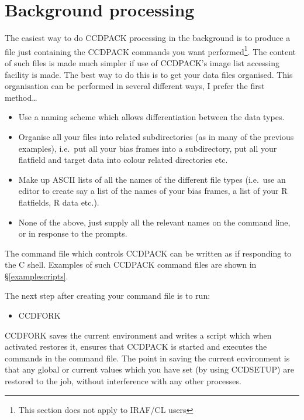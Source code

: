 \documentclass[twoside,11pt]{article}
\newcommand{\hyperref}[4]{#2\ref{#4}#3}
\newcommand{\htmlref}[2]{#1}
\newcommand{\xlabel}[1]{}
\renewcommand{\_}{\texttt{\symbol{95}}}
\newcommand{\routine}[1]{{\sc #1}}
\newcommand{\xroutine}[1]{\htmlref{{\sc #1}}{#1}}
\begin{document}
\section{\xlabel{backgroundprocessing}Background processing
         \label{backgroundprocessing}}

The easiest way to do CCDPACK processing in the background is to
produce a file just containing the CCDPACK commands you want
performed\footnote{This section does not apply to IRAF/CL users}. The
content of such files is made much simpler if use of CCDPACK's image
list accessing facility is made. The best way to do this is to get
your data files organised. This organisation can be performed in
several different ways, I prefer the first method\ldots

\begin{itemize}
\item Use a naming scheme which allows differentiation between the data
types.

\item Organise all your files into related subdirectories (as in many of
the previous examples), i.e.\ put all your bias frames into a
subdirectory, put all your flatfield and target data into colour related
directories etc.

\item Make up ASCII lists of all the names of the different file types
(i.e.\ use an editor to create say a list of the names of your bias
frames, a list of your R flatfields, R data etc.).


\item None of the above, just supply all the relevant names on the
command line, or in response to the prompts.
\end{itemize}

The command file which controls CCDPACK can be written as if
responding to the C shell. Examples of such CCDPACK command files
are shown \hyperref{elsewhere}{in \S}{}{examplescripts}.

The next step after creating your command file is to run:
\begin{itemize}
\item \xroutine{CCDFORK}
\end{itemize}

\routine{CCDFORK} saves the current environment and writes a script which
when activated restores it, ensures that CCDPACK is
started and executes the commands in the command file. The point in
saving the current environment is that any global or current values
which you have set (by using \xroutine{CCDSETUP}) are restored to the job,
without interference with any other processes.
\end{document}
